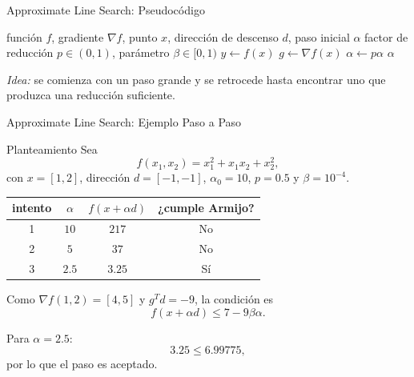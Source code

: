 \begin{frame}{Approximate Line Search: Pseudocódigo}
    \small
    \begin{algorithmic}[1]
        \Require función $f$, gradiente $\nabla f$, punto $x$,
                 dirección de descenso $d$, paso inicial $\alpha$
        \Require factor de reducción $p\in(0,1)$,
                 parámetro $\beta\in[0,1)$
        \State $y \gets f(x)$
        \State $g \gets \nabla f(x)$
            \State $\alpha \gets p\alpha$
        \EndWhile
        \State \Return $\alpha$
    \end{algorithmic}

    \vspace{0.5em}
    {\footnotesize
    \textit{Idea:} se comienza con un paso grande y se retrocede
    hasta encontrar uno que produzca una reducción suficiente.}
\end{frame}


\begin{frame}{Approximate Line Search: Ejemplo Paso a Paso}
    \begin{exampleblock}{Planteamiento}
        \small
        Sea
        \[
            f(x_1,x_2)=x_1^2+x_1x_2+x_2^2,
        \]
        con $x=[1,2]$, dirección $d=[-1,-1]$,
        $\alpha_0=10$, $p=0.5$ y $\beta=10^{-4}$.
    \end{exampleblock}

    \vspace{-0.2em}

    \begin{center}
    \scriptsize
    \begin{tabular}{c c c c}
        \toprule
        intento & $\alpha$ & $f(x+\alpha d)$
        & ¿cumple Armijo? \\
        \midrule
        1 & $10$  & $217$  & No \\
        2 & $5$   & $37$   & No \\
        3 & $2.5$ & $3.25$ & Sí \\
        \bottomrule
    \end{tabular}
    \end{center}

    \footnotesize
    Como $\nabla f(1,2)=[4,5]$ y
    $g^Td=-9$, la condición es
    \[
        f(x+\alpha d)
        \le
        7-9\beta\alpha.
    \]

    Para $\alpha=2.5$:
    \[
        3.25 \le 6.99775,
    \]
    por lo que el paso es aceptado.
\end{frame}


